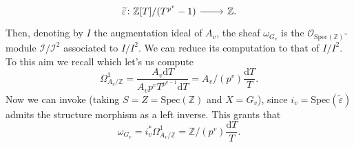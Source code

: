 \begin{ex}[]
\begin{enumerate}
		\begin{equation*}
		\begin{tikzcd}[row sep = 0ex
			,/tikz/column 1/.append style={anchor=base east}
			,/tikz/column 2/.append style={anchor=base west}]
			\widetilde{\varepsilon}\colon 
			\mathbb{Z}[T]/ (T^{p^v} - 1)\arrow[r, "", rightarrow] &
			\mathbb{Z}
		.\end{tikzcd}
		\end{equation*} 
		Then, denoting by $I$ the augmentation ideal of $A_v$,
		the sheaf $\omega_{G_v}$ is the $\mathcal{O}_{ \mathrm{Spec}(\mathbb{Z}) }$-module
		$\mathcal{I}/\mathcal{I}^2$ associated to $I/I^2$.
		We can reduce its computation to that of $I/I^2$.
		To this aim we recall \cite[\S6.1, proposition 1.8(d), example 1.10]{Liu}
		which let's us compute
		\begin{equation*}
			\Omega^1_{A_v/\mathbb{Z}} = \frac{ A_v \mathrm{d}T }{ A_v p^v T^{p^{v-1}} \mathrm{d}T }
			= A_v / (p^v) \frac{ \mathrm{d}T }{ T }
		.\end{equation*}
		Now we can invoke 
		\cite[\href{https://stacks.math.columbia.edu/tag/0474}{Lemma 0474}]{SP}
		(taking $S = Z = \mathrm{Spec}(\mathbb{Z})$ and $X = G_v$),
		since $i_v = \mathrm{Spec}(\widetilde{\varepsilon})$ admits the structure morphism
		as a left inverse.
		This grants that
		\begin{equation*}
		\omega_{G_v} = i_v^* \Omega^1_{A_v/\mathbb{Z}} =
		\mathbb{Z}/ (p^v) \frac{ \mathrm{d}T }{ T }
		.\end{equation*}
		

\end{enumerate}
\end{ex}
